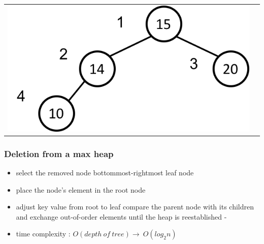 \documentclass[newPxFont,sthlmFooter,nooffset]{beamer}
\begin{document}
\begin{frame}[t]
\begin{tabular}{p{} p{}}
    \includegraphics[height=0.3\textheight]{./figures/fig14_heap_delete3.png}
\\
  \end{tabular}
\end{frame}


\begin{frame}[t]
  \frametitle{Deletion from a max heap}
  \begin{itemize}
  \item select the removed node bottommost-rightmost leaf node
  \item place the node’s element in the root node
  \item adjust key value
    from root to leaf compare the parent node with its children and
    exchange out-of-order elements until the heap is reestablished -
  \item time complexity : $O(depth~of~ tree) \rightarrow~ O(log_2n)$
  \end{itemize}

\end{frame}
\end{document}
